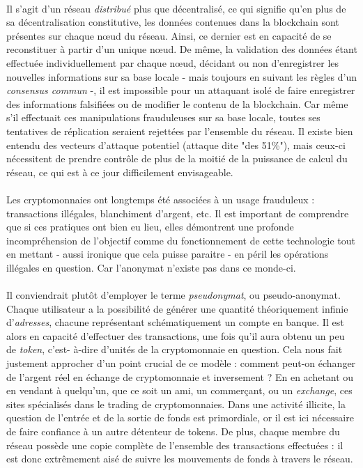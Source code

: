\paragraph{} Il s'agit d'un réseau \emph{distribué} plus que décentralisé, ce qui signifie qu'en plus de sa décentralisation
constitutive, les données contenues dans la blockchain sont présentes sur chaque n\oe{}ud du réseau. Ainsi, ce dernier est
en capacité de se reconstituer à partir d'un unique n\oe{}ud. De même, la validation des données étant effectuée individuellement
par chaque n\oe{}ud, décidant ou non d'enregistrer les nouvelles informations sur sa base locale - mais toujours en suivant 
les règles d'un \emph{consensus commun} -, il est impossible pour un attaquant isolé de faire enregistrer des informations 
falsifiées ou de modifier le contenu de la blockchain. Car même s'il effectuait ces manipulations frauduleuses sur sa base
locale, toutes ses tentatives de réplication seraient rejettées par l'ensemble du réseau. Il existe bien entendu des vecteurs
d'attaque potentiel (attaque dite "des 51\%"), mais ceux-ci nécessitent de prendre contrôle de plus de la moitié de la puissance
de calcul du réseau, ce qui est à ce jour difficilement envisageable.

\paragraph{} Les cryptomonnaies ont longtemps été associées à un usage frauduleux : transactions illégales, blanchiment d'argent, etc.
Il est important de comprendre que si ces pratiques ont bien eu lieu, elles démontrent une profonde incompréhension de 
l'objectif comme du fonctionnement de cette technologie tout en mettant - aussi ironique que cela puisse paraitre - en 
péril les opérations illégales en question. Car l'anonymat n'existe pas dans ce monde-ci.

\paragraph{} Il conviendrait plutôt d'employer le terme \emph{pseudonymat}, ou pseudo-anonymat. Chaque utilisateur a la
possibilité de générer une quantité théoriquement infinie d'\emph{adresses}, chacune représentant schématiquement un compte
en banque. Il est alors en capacité d'effectuer des transactions, une fois qu'il aura obtenu un peu de \emph{token}, c'est-
à-dire d'unités de la cryptomonnaie en question. Cela nous fait justement approcher d'un point crucial de ce modèle : 
comment peut-on échanger de l'argent réel en échange de cryptomonnaie et inversement ? En en achetant ou en vendant à quelqu'un,
que ce soit un ami, un commerçant, ou un \emph{exchange}, ces sites spécialisés dans le trading de cryptomonnaies. Dans 
une activité illicite, la question de l'entrée et de la sortie de fonds est primordiale, or il est ici nécessaire de faire 
confiance à un autre détenteur de tokens. De plus, chaque membre du réseau possède une copie complète de l'ensemble des 
transactions effectuées : il est donc extrêmement aisé de suivre les mouvements de fonds à travers le réseau.

